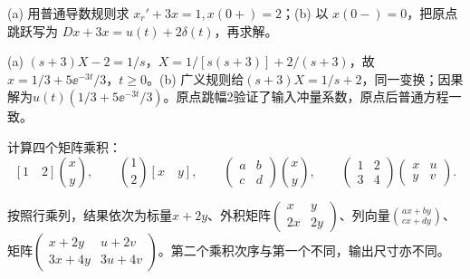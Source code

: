 \begin{exercise}\label{cw:rec19-4}
(a) 用普通导数规则求 $x_r'+3x=1,x(0+)=2$；(b) 以 $x(0-)=0$，把原点跳跃写为 $Dx+3x=u(t)+2\delta(t)$，再求解。
\end{exercise}
\begin{solution}
(a) $(s+3)X-2=1/s$，$X=1/[s(s+3)]+2/(s+3)$，故$x=1/3+5\ee^{-3t}/3$，$t\ge0$。(b) 广义规则给$(s+3)X=1/s+2$，同一变换；因果解为$u(t)(1/3+5\ee^{-3t}/3)$。原点跳幅2验证了输入冲量系数，原点后普通方程一致。
\par{}
\end{solution}

\begin{exercise}\label{cw:rec21-1}
计算四个矩阵乘积：
\[[1\quad2]\binom xy,\qquad\binom12[x\quad y],\qquad\begin{pmatrix}a&b\\c&d\end{pmatrix}\binom xy,\qquad\begin{pmatrix}1&2\\3&4\end{pmatrix}\begin{pmatrix}x&u\\y&v\end{pmatrix}.\]
\end{exercise}
\begin{solution}
按照行乘列，结果依次为标量$x+2y$、外积矩阵$\begin{pmatrix}x&y\\2x&2y\end{pmatrix}$、列向量$\binom{ax+by}{cx+dy}$、矩阵$\begin{pmatrix}x+2y&u+2v\\3x+4y&3u+4v\end{pmatrix}$。第二个乘积次序与第一个不同，输出尺寸亦不同。
\par{}
\end{solution}

